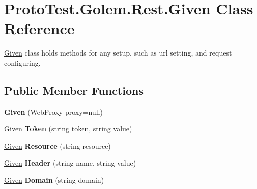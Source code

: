 \hypertarget{class_proto_test_1_1_golem_1_1_rest_1_1_given}{\section{Proto\-Test.\-Golem.\-Rest.\-Given Class Reference}
\label{class_proto_test_1_1_golem_1_1_rest_1_1_given}
}


\hyperlink{class_proto_test_1_1_golem_1_1_rest_1_1_given}{Given} class holds methods for any setup, such as url setting, and request configuring.  


\subsection*{Public Member Functions}
\begin{DoxyCompactItemize}
\item 
\hypertarget{class_proto_test_1_1_golem_1_1_rest_1_1_given_a569483fa93d98af5f18d6773cfa3ecff}{{\bfseries Given} (Web\-Proxy proxy=null)}\label{class_proto_test_1_1_golem_1_1_rest_1_1_given_a569483fa93d98af5f18d6773cfa3ecff}

\item 
\hypertarget{class_proto_test_1_1_golem_1_1_rest_1_1_given_ae224b88756981cc6ff7b1acfa8f90eb7}{\hyperlink{class_proto_test_1_1_golem_1_1_rest_1_1_given}{Given} {\bfseries Token} (string token, string value)}\label{class_proto_test_1_1_golem_1_1_rest_1_1_given_ae224b88756981cc6ff7b1acfa8f90eb7}

\item 
\hypertarget{class_proto_test_1_1_golem_1_1_rest_1_1_given_afd66b9a64fddcff9d28728ac8da069d6}{\hyperlink{class_proto_test_1_1_golem_1_1_rest_1_1_given}{Given} {\bfseries Resource} (string resource)}\label{class_proto_test_1_1_golem_1_1_rest_1_1_given_afd66b9a64fddcff9d28728ac8da069d6}

\item 
\hypertarget{class_proto_test_1_1_golem_1_1_rest_1_1_given_a59aa37dc578bcc8f6aa22e8382ac64cb}{\hyperlink{class_proto_test_1_1_golem_1_1_rest_1_1_given}{Given} {\bfseries Header} (string name, string value)}\label{class_proto_test_1_1_golem_1_1_rest_1_1_given_a59aa37dc578bcc8f6aa22e8382ac64cb}

\item 
\hypertarget{class_proto_test_1_1_golem_1_1_rest_1_1_given_acfff6ad2f17e096912306ba03fc4a77c}{\hyperlink{class_proto_test_1_1_golem_1_1_rest_1_1_given}{Given} {\bfseries Domain} (string domain)}\label{class_proto_test_1_1_golem_1_1_rest_1_1_given_acfff6ad2f17e096912306ba03fc4a77c}


\end{DoxyCompactItemize}
